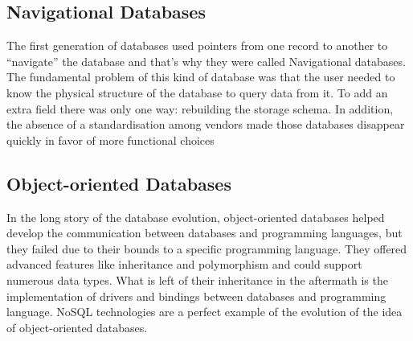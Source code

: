 \subsection{Navigational Databases}
The first generation of databases used pointers from one record to another to “navigate” the database and that’s why they were called Navigational databases.
The fundamental problem of this kind of database was that the user needed to know the physical structure of the database to query data from it. 
To add an extra field there was only one way: rebuilding the storage schema.
In addition, the absence of a standardisation among vendors made those databases disappear quickly in favor of more functional choices

\subsection{Object-oriented Databases}
In the long story of the database evolution, object-oriented databases helped develop the communication between databases and programming languages, but they failed due to their bounds to a specific programming language. They offered advanced features like inheritance and polymorphism and could support numerous data types.
What is left of their inheritance in the aftermath is the implementation of drivers and bindings between databases and programming language.
NoSQL technologies are a perfect example of the evolution of the idea of object-oriented databases.


